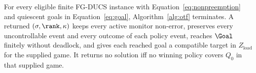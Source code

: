 \begin{theorem}
\label{thm:correctness}
\label{thm:termination}
\label{thm:soundness}
\label{thm:completeness}
For every eligible finite FG-DUCS instance with Equation~\eqref{eq:nonpreemption} and quiescent goals in Equation~\eqref{eq:goal}, Algorithm~\ref{alg:otf} terminates. A returned $(\sigma,\rank,\kappa)$ keeps every active monitor non-error, preserves every uncontrollable event and every outcome of each policy event, reaches $\Goal$ finitely without deadlock, and gives each reached goal a compatible target in $Z_{\mathrm{load}}$ for the supplied game. It returns no solution iff no winning policy covers $Q_0$ in that supplied game.
\end{theorem}


